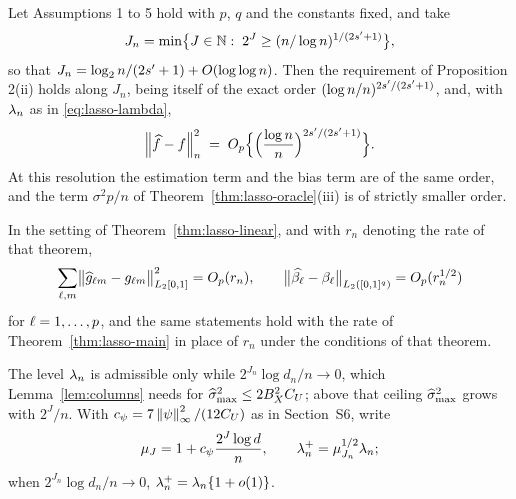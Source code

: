 \begin{theorem}
\label{thm:lasso-linear}
Let Assumptions 1 to 5 hold with $p$, $q$ and the constants fixed, and take
\begin{equation}
  \label{eq:lasso-Jn}
  J_n = \min\bigl\{J \in \mathbb{N} :\;
  2^{J} \ge (n/\log n)^{1/(2s'+1)}\bigr\},
\end{equation}
so that $J_n = \log_2 n/(2s'+1) + O(\log\log n)$. Then the requirement of
Proposition 2(ii) holds along $J_n$, being itself of the exact order
$(\log n/n)^{2s'/(2s'+1)}$, and, with $\lambda_{n}$ as in
\eqref{eq:lasso-lambda},
\[
  \left\lVert \widehat{f}-f \right\rVert_{n}^{2}
  \;=\; O_p\Bigl\{\Bigl(\frac{\log n}{n}\Bigr)^{2s'/(2s'+1)}\Bigr\} .
\]
At this resolution the estimation term and the bias term are of the same
order, and the term $\sigma^{2}p/n$ of Theorem~\ref{thm:lasso-oracle}(iii) is
of strictly smaller order.
\end{theorem}

\begin{corollary}
\label{cor:lasso-components}
In the setting of Theorem~\ref{thm:lasso-linear}, and with $r_n$ denoting the
rate of that theorem,
\[
  \sum_{\ell,m}\bigl\lVert\widehat{g}_{\ell m}-g_{\ell m}
  \bigr\rVert_{L_2[0,1]}^{2} = O_p(r_n),
  \qquad
  \bigl\lVert\widehat{\beta_{\ell}}-\beta_{\ell}
  \bigr\rVert_{L_2([0,1]^{q})} = O_p(r_n^{1/2})
\]
for $\ell = 1,\dots,p$, and the same statements hold with the rate of
Theorem~\ref{thm:lasso-main} in place of $r_n$ under the conditions of that
theorem.
\end{corollary}

The level $\lambda_{n}$ is admissible only while $2^{J_n}\log d_n/n \to 0$, which
Lemma~\ref{lem:columns} needs for $\widehat{\sigma}_{\max}^{2} \le 2B_X^{2}C_U$; above that
ceiling $\widehat{\sigma}_{\max}^{2}$ grows with $2^{J}/n$. With $c_{\psi} =
7\left\lVert \psi \right\rVert_{\infty}^{2}/(12C_U)$ as in Section~S6, write
\begin{equation}
  \label{eq:lasso-lamplus}
  \mu_{J} = 1 + c_{\psi}\frac{2^{J}\log d}{n},
  \qquad
  \lambda_{n}^{+} = \mu_{J_n}^{1/2}\lambda_{n} ;
\end{equation}
when $2^{J_n}\log d_n/n \to 0$, $\lambda_{n}^{+} = \lambda_{n}\{1 + o(1)\}$.

